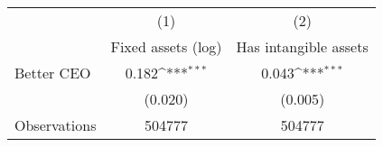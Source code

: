 {
\def\sym#1{\ifmmode^{#1}\else\(^{#1}\)\fi}
\begin{tabular}{l*{2}{c}}
\hline\hline
                    &\multicolumn{1}{c}{(1)}&\multicolumn{1}{c}{(2)}\\
                    &\multicolumn{1}{c}{Fixed assets (log)}&\multicolumn{1}{c}{Has intangible assets}\\
\hline
Better CEO          &       0.182\sym{***}&       0.043\sym{***}\\
                    &     (0.020)         &     (0.005)         \\
\hline
Observations        &      504777         &      504777         \\
\hline\hline
\end{tabular}
}
